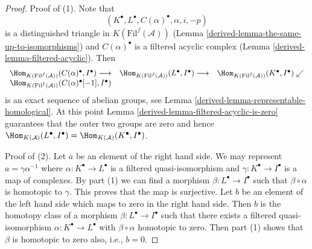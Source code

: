 \begin{proof}

Proof of (1). Note that
$$
(K^\bullet, L^\bullet, C(\alpha)^\bullet, \alpha, i, -p)
$$
is a distinguished triangle in $K(\text{Fil}^f(\mathcal{A}))$
(Lemma \ref{derived-lemma-the-same-up-to-isomorphisms})
and $C(\alpha)^\bullet$ is a filtered acyclic complex
(Lemma \ref{derived-lemma-filtered-acyclic}).
Then
$$
\begin{array}{ccc}\Hom_{K(\text{Fil}^f(\mathcal{A}))}(C(\alpha)^\bullet, I^\bullet) \longrightarrow & \Hom_{K(\text{Fil}^f(\mathcal{A}))}(L^\bullet, I^\bullet) \longrightarrow & \Hom_{K(\text{Fil}^f(\mathcal{A}))}(K^\bullet, I^\bullet) \swarrow \\ \Hom_{K(\text{Fil}^f(\mathcal{A}))}(C(\alpha)^\bullet[-1], I^\bullet) &  & \end{array}
$$
is an exact sequence of abelian groups, see
Lemma \ref{derived-lemma-representable-homological}.
At this point
Lemma \ref{derived-lemma-filtered-acyclic-is-zero}
guarantees that the outer two groups are zero and hence
$\Hom_{K(\mathcal{A})}(L^\bullet, I^\bullet) =
\Hom_{K(\mathcal{A})}(K^\bullet, I^\bullet)$.

\medskip\noindent
Proof of (2).
Let $a$ be an element of the right hand side.
We may represent $a = \gamma\alpha^{-1}$ where
$\alpha : K^\bullet \to L^\bullet$
is a filtered quasi-isomorphism and $\gamma : K^\bullet \to I^\bullet$
is a map of complexes. By part (1)
we can find a morphism $\beta : L^\bullet \to I^\bullet$ such that
$\beta \circ \alpha$ is homotopic to $\gamma$. This proves that the
map is surjective. Let $b$ be an element of the left hand side
which maps to zero in the right hand side. Then $b$ is the homotopy class
of a morphism $\beta : L^\bullet \to I^\bullet$ such that there exists a
filtered quasi-isomorphism $\alpha : K^\bullet \to L^\bullet$ with
$\beta  \circ \alpha$ homotopic to zero. Then part (1)
shows that $\beta$ is homotopic to zero also, i.e., $b = 0$.
\end{proof}

